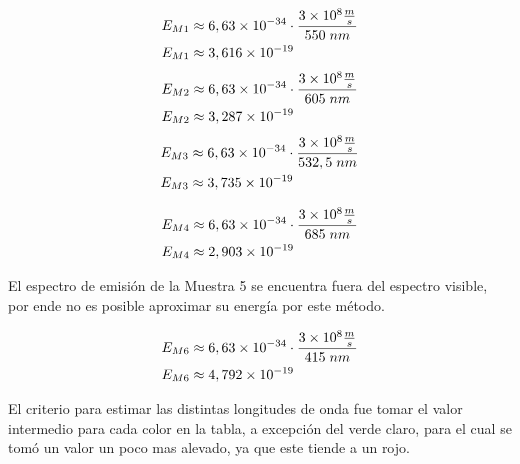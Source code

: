 \documentclass[12pt]{report}
\begin{document}
\begin{minipage}[t]{0.48\textwidth}
  $$
  \begin{aligned}
    E_{M1}& \approx 6,63\times10^{-34}\cdot \frac{3\times10^8 \frac{m}{s} }{ 550 \hspace{1mm}nm}\\
    E_{M1}& \approx 3,616 \times10^{-19}
  \end{aligned}
  $$
  \vspace{5mm}
  $$
  \begin{aligned}
    E_{M2}& \approx 6,63\times10^{-34}\cdot \frac{3\times10^8 \frac{m}{s} }{ 605 \hspace{1mm}nm}\\
    E_{M2}& \approx  3,287 \times10^{-19}
  \end{aligned}
  $$
  \vspace{5mm}
  $$
  \begin{aligned}
    E_{M3}& \approx 6,63\times10^{-34}\cdot \frac{3\times10^8 \frac{m}{s} }{ 532,5 \hspace{1mm}nm}\\
    E_{M3}& \approx  3,735 \times10^{-19}
  \end{aligned}
  $$
\end{minipage}
\hfill
\begin{minipage}[t]{0.48\textwidth}
  $$
  \begin{aligned}
    E_{M4}& \approx 6,63\times10^{-34}\cdot \frac{3\times10^8 \frac{m}{s} }{ 685 \hspace{1mm}nm}\\
    E_{M4}& \approx 2,903 \times10^{-19}
  \end{aligned}
  $$
  \vspace{2mm}

  El espectro de emisión de la Muestra 5 se encuentra fuera del espectro visible, por ende 
  no es posible aproximar su energía por este método.

  \vspace{2mm}
  $$
  \begin{aligned}
    E_{M6}& \approx 6,63\times10^{-34}\cdot \frac{3\times10^8 \frac{m}{s} }{ 415 \hspace{1mm}nm}\\
    E_{M6}& \approx  4,792 \times10^{-19}
  \end{aligned}
  $$
\end{minipage}

El criterio para estimar las distintas longitudes de onda fue tomar el valor intermedio para cada
color en la tabla, a excepción del verde claro, para el cual se tomó un valor un poco mas alevado,
ya que este tiende a un rojo.
\end{document}
